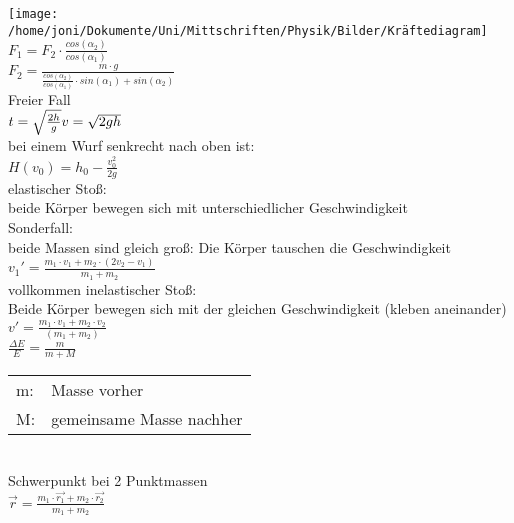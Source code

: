 \documentclass[a4paper,12pt]{scrartcl}
\begin{document}
\texttt{[image: /home/joni/Dokumente/Uni/Mittschriften/Physik/Bilder/Kräftediagram]}\\

$F_1 = F_2 \cdot \frac{cos(\alpha_2)}{cos(\alpha_1)}$\\
$F_2 = \frac{m \cdot g}{\frac{cos(\alpha_2)}{cos(\alpha_1)} \cdot sin(\alpha_1)+sin(\alpha_2)}$\\


\newpage
Freier Fall\\
$t = \sqrt{\frac{2h}{g}}\\
v = \sqrt{2gh}$\\

bei einem Wurf senkrecht nach oben ist:\\
$H(v_0) = h_0 - \frac{v_0^2}{2g}$\\

 
elastischer Stoß:\\
beide Körper bewegen sich mit unterschiedlicher Geschwindigkeit\\
Sonderfall:\\
beide Massen sind gleich groß: Die Körper tauschen die Geschwindigkeit\\
$v_1' = \frac{m_1 \cdot v_1 + m_2 \cdot (2v_2 - v_1)}{m_1 + m_2}$\\

vollkommen inelastischer Stoß:\\
Beide Körper bewegen sich mit der gleichen Geschwindigkeit (kleben aneinander)\\
$v'= \frac{m_1 \cdot v_1 + m_2 \cdot v_2}{(m_1+m_2)}$\\
$\frac{\Delta E}{E} = \frac{m}{m+M}$\\
\begin{tabular}{ll}
m: & Masse vorher\\
M: & gemeinsame Masse nachher\\
\end{tabular}
\\
Schwerpunkt bei 2 Punktmassen\\
$\overrightarrow{r} = \frac{m_1 \cdot \overrightarrow{r_1} + m_2 \cdot \overrightarrow{r_2}}{m_1 + m_2}$


\newpage
\end{document}
